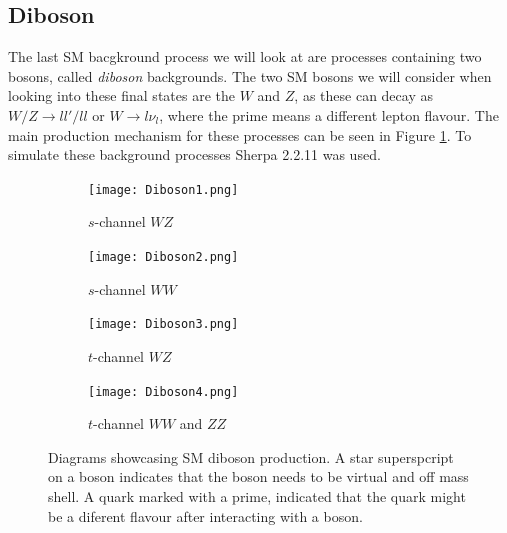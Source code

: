 \documentclass[12pt, a4paper]{book}
\begin{document}
\subsection{Diboson}
The last SM bacgkround process we will look at are processes containing two bosons, called \textit{diboson} backgrounds. The two SM bosons we will consider when looking into these final states are the $W$ and $Z$, as these can decay as $W/Z\rightarrow ll'/ll$ 
or $W\rightarrow l\nu_l$, where the prime means a different lepton flavour. The main production mechanism for these processes can be seen in Figure \ref{fig:Diboson_BKG}. To simulate these background processes Sherpa 2.2.11 \cite{Sherpa} was used.
\begin{figure}[!ht]
    \centering 
    \begin{subfigure}[b]{0.4\textwidth}
        \centering
        \texttt{[image: Diboson1.png]}
        \caption{$s$-channel $WZ$}
    \end{subfigure}
    \hfill
    \begin{subfigure}[b]{0.4\textwidth}
        \centering
        \texttt{[image: Diboson2.png]}
        \caption{$s$-channel $WW$}
    \end{subfigure}
    \hfill
    \begin{subfigure}[b]{0.4\textwidth}
        \centering
        \texttt{[image: Diboson3.png]}
        \caption{$t$-channel $WZ$}
    \end{subfigure}
    \hfill
    \begin{subfigure}[b]{0.4\textwidth}
        \centering
        \texttt{[image: Diboson4.png]}
        \caption{$t$-channel $WW$ and $ZZ$}
    \end{subfigure}
    \caption[Diboson production]{Diagrams showcasing SM diboson production. A star superspcript on a boson indicates that the boson needs to be virtual and off mass shell.  A quark marked with a prime, indicated that the quark might be a diferent flavour after interacting with a boson. }\label{fig:Diboson_BKG}
\end{figure}
\end{document}

